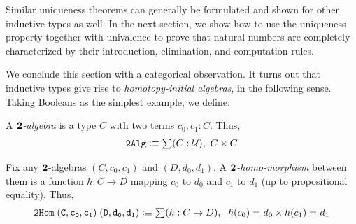 Similar uniqueness theorems can generally be formulated and shown for other inductive types as well. In the next section, we show how to use the uniqueness property together with univalence to prove that natural numbers are completely characterized by their introduction, elimination, and computation rules.


We conclude this section with a categorical observation. It turns out that inductive types give rise to \emph{homotopy-initial algebras}, in the following sense. Taking Booleans as the simplest example, we define:

\begin{defn}
A \emph{$\mathbf{2}$-algebra} is a type $C$ with two terms $c_0, c_1 : C$. Thus,
\begin{align*}
\mathtt{2Alg} \defeq \sm {C : \type} C \times C
\end{align*}
\end{defn}

\begin{defn}
Fix any $\mathbf{2}$-algebras $(C,c_0,c_1)$ and $(D,d_0,d_1)$. A \emph{$\mathbf{2}$-homo-morphism} between them is a function $h : C \to D$ mapping $c_0$ to $d_0$ and
$c_1$ to $d_1$ (up to propositional equality). Thus,
\begin{align*}
\mathtt{2Hom \; (C,c_0,c_1) \; (D,d_0,d_1)} \defeq \sm {h : C \to D} \; \id{h(c_0)}{d_0} \times \id{h(c_1)}{d_1}
\end{align*}
\end{defn}

